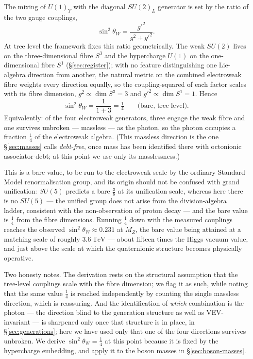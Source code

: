 The mixing of $U(1)_Y$ with the diagonal $SU(2)_L$ generator is set by the ratio of the two gauge
couplings,
\begin{equation}
  \sin^2\theta_W = \frac{g'^2}{g^2 + g'^2}.
\end{equation}
At tree level the framework fixes this ratio geometrically. The weak $SU(2)$ lives on the
three-dimensional fibre $S^3$ and the hypercharge $U(1)$ on the one-dimensional fibre $S^1$
(\S\ref{sec:register}); with no feature distinguishing one Lie-algebra direction from another, the
natural metric on the combined electroweak fibre weights every direction equally, so the
coupling-squared of each factor scales with its fibre dimension, $g^2 \propto \dim S^3 = 3$ and
$g'^2 \propto \dim S^1 = 1$. Hence
\begin{equation}
  \sin^2\theta_W = \frac{1}{1+3} = \tfrac14
  \qquad\text{(bare, tree level).}
\end{equation}
Equivalently: of the four electroweak generators, three engage the weak fibre and one survives
unbroken --- massless --- as the photon, so the photon occupies a fraction $\tfrac14$ of the
electroweak algebra. (This massless direction is the one \S\ref{sec:masses} calls \emph{debt-free},
once mass has been identified there with octonionic associator-debt; at this point we use only its
masslessness.)

This is a bare value, to be run to the electroweak scale by the ordinary Standard Model
renormalisation group, and its origin should not be confused with grand unification: $SU(5)$
predicts a bare $\tfrac38$ at its unification scale, whereas here there is no $SU(5)$ --- the
unified group does not arise from the division-algebra ladder, consistent with the non-observation
of proton decay --- and the bare value is $\tfrac14$ from the fibre dimensions. Running $\tfrac14$
down with the measured couplings reaches the observed $\sin^2\theta_W \approx 0.231$ at $M_Z$, the
bare value being attained at a matching scale of roughly $3.6\ \mathrm{TeV}$ --- about fifteen
times the Higgs vacuum value, and just above the scale at which the quaternionic structure becomes
physically operative.

Two honesty notes. The derivation rests on the structural assumption that the tree-level couplings
scale with the fibre dimension; we flag it as such, while noting that the same value $\tfrac14$ is
reached independently by counting the single massless direction, which is reassuring. And the
identification of \emph{which} combination is the photon --- the direction blind to the generation
structure as well as VEV-invariant --- is sharpened only once that structure is in place, in
\S\ref{sec:generations}; here we have used only that one of the four directions survives unbroken.
We derive $\sin^2\theta_W = \tfrac14$ at this point because it is fixed by the hypercharge embedding,
and apply it to the boson masses in \S\ref{sec:boson-masses}.


